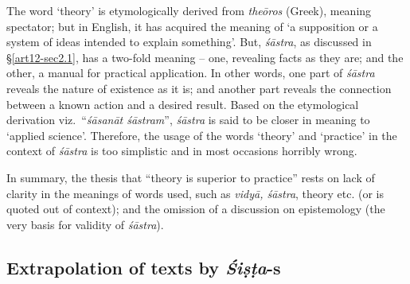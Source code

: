The word `theory' is etymologically derived from {\sl theōros} (Greek), meaning spectator; but in English, it has acquired the meaning of `a supposition or a system of ideas intended to explain something'. But, {\sl śāstra}, as discussed in \S\ref{art12-sec2.1}, has a two-fold meaning -- one, revealing facts as they are; and the other, a manual for practical application. In other words, one part of {\sl śāstra} reveals the nature of existence as it is; and another part reveals the connection between a known action and a desired result. Based on the etymological derivation viz.\ ``{\sl śāsanāt śāstram}'', {\sl śāstra} is said to be closer in meaning to `applied science'. Therefore, the usage of the words ‘theory’ and ‘practice’ in the context of {\sl śāstra} is too simplistic and in most occasions horribly wrong. 

In summary, the thesis that ``theory is superior to practice'' rests on lack of clarity in the meanings of words used, such as {\sl vidyā, śāstra}, theory etc. (or is quoted out of context); and the omission of a discussion on epistemology (the very basis for validity of {\sl śāstra}).\\[-18pt]

\subsection{Extrapolation of texts by {{\sl\bfseries Śiṣṭa}\relax}-s}\label{art12-sec3.6}

